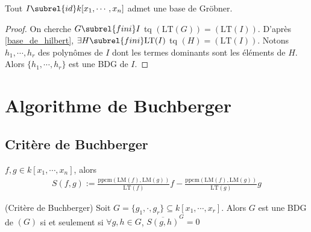             \begin{theo}
                Tout $I \subrel{id} k[x_1, \cdots, x_n]$ admet une base de Gröbner.
            \end{theo}
            \begin{proof}
                On cherche $G \subrel{fini} I$ tq $(\mathrm{LT}(G)) = (\mathrm{LT}(I))$. D'après \ref{base_de_hilbert}, $\exists H \subrel{fini} \mathrm{LT}(I)$ tq $(H) = (\mathrm{LT}(I))$. Notons $h_1, \cdots, h_r$ des polynômes de $I$ dont les termes dominants sont les éléments de $H$. Alors $\{h_1, \cdots, h_r\}$ est une BDG de $I$.
            \end{proof}

    \section{Algorithme de Buchberger}
        \subsection{Critère de Buchberger}
            \begin{defi}
                $f,g \in k[x_1, \cdots, x_n]$, alors
                \begin{align*}
                    S(f,g) := \frac{\mathrm{ppcm} (\mathrm{LM}(f), \mathrm{LM}(g))}{\mathrm{LT}(f)}f - \frac{\mathrm{ppcm} (\mathrm{LM}(f), \mathrm{LM}(g))}{\mathrm{LT}(g)}g
                \end{align*}
            \end{defi}
            \begin{theo} (Critère de Buchberger)
                Soit $G = \{g_1, \cdot, g_r\} \subseteq k[x_1, \cdots, x_r]$. Alors $G$ est une BDG de $(G)$ si et seulement si $\forall g,h \in G$, $\overline{S(g,h)}^G = 0$
            \end{theo}